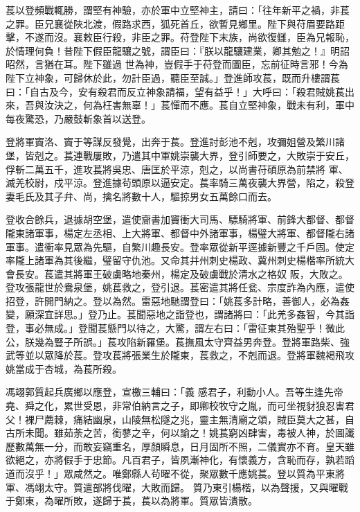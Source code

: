 \begin{pinyinscope}
 萇以登頻戰輒勝，謂堅有神驗，亦於軍中立堅神主，請曰：「往年新平之禍，非萇之罪。臣兄襄從陜北渡，假路求西，狐死首丘，欲暫見鄉里。陛下與苻眉要路距擊，不遂而沒。襄敕臣行殺，非臣之罪。苻登陛下末族，尚欲復讎，臣為兄報恥，於情理何負！昔陛下假臣龍驤之號，謂臣曰：『朕以龍驤建業，卿其勉之！』明詔昭然，言猶在耳。陛下雖過
 世為神，豈假手于苻登而圖臣，忘前征時言邪！今為陛下立神象，可歸休於此，勿計臣過，聽臣至誠。」登進師攻萇，既而升樓謂萇曰：「自古及今，安有殺君而反立神象請福，望有益乎！」大呼曰：「殺君賊姚萇出來，吾與汝決之，何為枉害無辜！」萇憚而不應。萇自立堅神象，戰未有利，軍中每夜驚恐，乃嚴鼓斬象首以送登。



 登將軍竇洛、竇于等謀反發覺，出奔于萇。登進討彭池不剋，攻彌姐營及繁川諸堡，皆剋之。萇連戰屢敗，乃遣其中軍姚崇襲大界，登引師要之，大敗崇于安丘，俘斬二萬五千，進攻萇將吳忠、唐匡於平涼，剋之，以尚書苻碩原為前禁將
 軍、滅羌校尉，戍平涼。登進據茍頭原以逼安定。萇率騎三萬夜襲大界營，陷之，殺登妻毛氏及其子弁、尚，擒名將數十人，驅掠男女五萬餘口而去。



 登收合餘兵，退據胡空堡，遣使齎書加竇衝大司馬、驃騎將軍、前鋒大都督、都督隴東諸軍事，楊定左丞相、上大將軍、都督中外諸軍事，楊璧大將軍、都督隴右諸軍事。遣衝率見眾為先驅，自繁川趣長安。登率眾從新平逕據新豐之千戶固。使定率隴上諸軍為其後繼，璧留守仇池。又命其并州刺史楊政、冀州刺史楊楷率所統大會長安。萇遣其將軍王破虜略地秦州，楊定及破虜戰於清水之格奴
 阪，大敗之。登攻張龍世於鴦泉堡，姚萇救之，登引退。萇密遣其將任瓫、宗度詐為內應，遣使招登，許開門納之。登以為然。雷惡地馳謂登曰：「姚萇多計略，善御人，必為姦變，願深宜詳思。」登乃止。萇聞惡地之詣登也，謂諸將曰：「此羌多姦智，今其詣登，事必無成。」登聞萇懸門以待之，大驚，謂左右曰：「雷征東其殆聖乎！微此公，朕幾為豎子所誤。」萇攻陷新羅堡。萇撫風太守齊益男奔登。登將軍路柴、強武等並以眾降於萇。登攻萇將張業生於隴東，萇救之，不剋而退。登將軍魏褐飛攻姚當成于杏城，為萇所殺。



 馮翊郭質起兵廣鄉以應登，宣檄三輔曰：「義
 感君子，利動小人。吾等生逢先帝堯、舜之化，累世受恩，非常伯納言之子，即卿校牧守之胤，而可坐視豺狼忍害君父！裸尸薦棘，痛結幽泉，山陵無松隧之兆，靈主無清廟之頌，賊臣莫大之甚，自古所未聞。雖茹荼之苦，銜蓼之辛，何以諭之！姚萇窮凶肆害，毒被人神，於圖讖歷數萬無一分，而敢妄竊重名，厚顏瞬息，日月固所不照，二儀實亦不育。皇天雖欲絕之，亦將假手于忠節。凡百君子，皆夙漸神化，有懷義方，含恥而存，孰若蹈道而沒乎！」眾咸然之。唯鄭縣人茍曜不從，聚眾數千應姚萇。登以質為平東將軍、馮翊太守。質遣部將伐曜，大敗而歸。
 質乃東引楊楷，以為聲援，又與曜戰于鄭東，為曜所敗，遂歸于萇，萇以為將軍。質眾皆潰散。




\end{pinyinscope}
